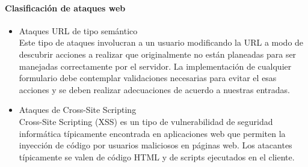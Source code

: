 \documentclass[12pt, a4paper, titlepage]{article}
\begin{document}
		\paragraph{Clasificación de ataques web}
		\begin{itemize}
		\item Ataques URL de tipo semántico\\
		Este tipo de ataques involucran a un usuario modificando la URL a modo de descubrir acciones a realizar que originalmente no están planeadas para ser manejadas correctamente por el servidor. La implementación de cualquier formulario debe contemplar validaciones necesarias para evitar el esas acciones y se deben realizar adecuaciones de acuerdo a nuestras entradas.
		\item Ataques de Cross-Site Scripting \\
		Cross-Site Scripting (XSS) es un tipo de vulnerabilidad de seguridad informática típicamente encontrada en aplicaciones web que permiten la inyección de código por usuarios maliciosos en páginas web. Los atacantes típicamente se valen de código HTML y de scripts ejecutados en el cliente. 
		

\end{itemize}
\end{document}
